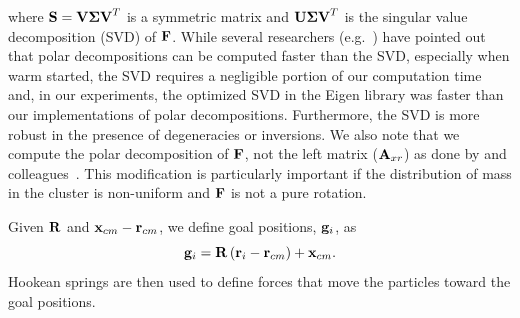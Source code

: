 \documentclass[review]{acmsiggraph}
\begin{document}
where $\mathit{\mathbf{S}}=\mathit{\mathbf{V\Sigma V}}^T$ is a symmetric matrix and $\mathit{\mathbf{U\Sigma V}}^T$ is the singular value decomposition (SVD) of $\mathit{\mathbf{F}}$.
While several researchers (e.g.~\cite{Rivers:2007:FFL}) have pointed out that polar decompositions can be computed faster than the SVD,
especially when warm started, the SVD requires a negligible portion of our computation time and, in our experiments, 
the optimized SVD in the Eigen library was faster than our implementations of polar decompositions.  Furthermore, the SVD is more robust in
the presence of degeneracies or inversions.
We also note that we compute the polar decomposition of $\mathit{\mathbf{F}}$, not
the left matrix ($\mathit{\mathbf{A}}_{xr}$)
as done by \Mueller and colleagues~.  This modification
is particularly important if the distribution of mass in the cluster is non-uniform and $\mathit{\mathbf{F}}$ is not a pure rotation.

Given $\mathit{\mathbf{R}}$ and $\mathit{\mathbf{x}}_{cm}-\mathit{\mathbf{r}}_{cm}$, we define goal positions, $\mathit{\mathbf{g}}_i$, as
\begin{equation}
\mathit{\mathbf{g}}_i = \mathit{\mathbf{R}}\left(\mathit{\mathbf{r}}_i-\mathit{\mathbf{r}}_{cm}\right)+\mathit{\mathbf{x}}_{cm}.
\end{equation}
Hookean springs are then used to define forces that move the particles toward the goal positions.
\end{document}
